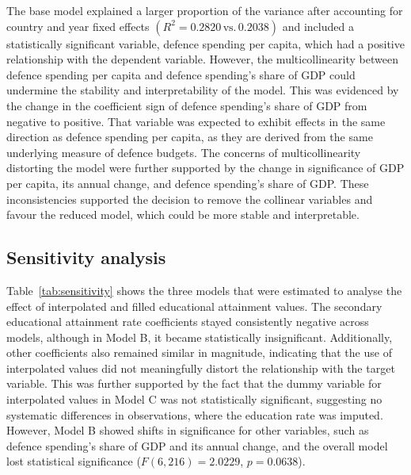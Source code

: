 The base model explained a larger proportion of the variance after accounting for country and year fixed effects $(R^2 = 0.2820\, \text{vs.} \,0.2038)$ and included a statistically significant variable, defence spending per capita, which had a positive relationship with the dependent variable. 
However, the multicollinearity between defence spending per capita and defence spending's share of GDP could undermine the stability and interpretability of the model. 
This was evidenced by the change in the coefficient sign of defence spending's share of GDP from negative to positive. 
That variable was expected to exhibit effects in the same direction as defence spending per capita, as they are derived from the same underlying measure of defence budgets.
The concerns of multicollinearity distorting the model were further supported by the change in significance of GDP per capita, its annual change, and defence spending's share of GDP.
These inconsistencies supported the decision to remove the collinear variables and favour the reduced model, which could be more stable and interpretable.

\subsection{Sensitivity analysis}

Table~\ref{tab:sensitivity} shows the three models that were estimated to analyse the effect of interpolated and filled educational attainment values.
The secondary educational attainment rate coefficients stayed consistently negative across models, although in Model B, it became statistically insignificant. 
Additionally, other coefficients also remained similar in magnitude, indicating that the use of interpolated values did not meaningfully distort the relationship with the target variable. 
This was further supported by the fact that the dummy variable for interpolated values in Model C was not statistically significant, suggesting no systematic differences in observations, where the education rate was imputed.
However, Model B showed shifts in significance for other variables, such as defence spending's share of GDP and its annual change, and the overall model lost statistical significance ($F(6,216)=2.0229$, $p=0.0638$).

\renewcommand{\arraystretch}{1.2}

